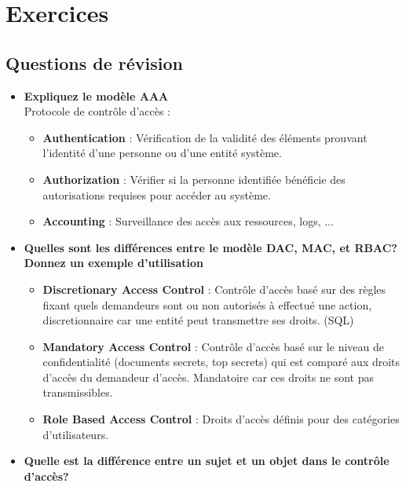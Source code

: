 \documentclass{report}
\begin{document}
	\section{Exercices}

		\subsection{Questions de révision}
			\begin{itemize}
				\item \textbf{Expliquez le modèle AAA}\\

					Protocole de contrôle d'accès : \\

					\begin{itemize}
						\item \textbf{Authentication} : Vérification de la validité des éléments prouvant l'identité d'une personne ou d'une entité système.
						\item \textbf{Authorization} : Vérifier si la personne identifiée bénéficie des autorisations requises pour accéder au système.
						\item \textbf{Accounting} : Surveillance des accès aux ressources, logs, ...\\
					\end{itemize}

				\item \textbf{Quelles sont les différences entre le modèle DAC, MAC, et RBAC? Donnez un exemple d'utilisation}\\

					\begin{itemize}
						\item \textbf{Discretionary Access Control} : Contrôle d'accès basé sur des règles fixant quels demandeurs sont ou non autorisés à effectué une action, discretionnaire car une entité peut transmettre ses droits. (SQL)
						\item \textbf{Mandatory Access Control} : Contrôle d'accès basé sur le niveau de confidentialité (documents secrets, top secrets) qui est comparé aux droits d'accès du demandeur d'accès. Mandatoire car ces droits ne sont pas transmissibles.
						\item \textbf{Role Based Access Control} : Droits d'accès définis pour des catégories d'utilisateurs.\\
					\end{itemize}

				\item \textbf{Quelle est la différence entre un sujet et un objet dans le contrôle d'accès?}\\


\end{itemize}
\end{document}
